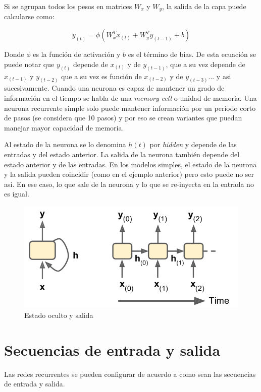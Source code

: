 Si se agrupan todos los pesos en matrices $W_{x}$ y $W_{y}$, la salida de la capa puede calcularse como: 

\begin{equation}
	y_{(t)} = \phi (W_x^{T} x_{(t)} + W_y^{T} y_{(t-1)} + b)
\end{equation}

Donde $\phi$ es la función de activación y $b$ es el término de bias. De esta ecuación se  puede notar que $y_{(t)}$ depende de $x_{(t)}$ y de $y_{(t-1)}$, que a su vez depende de $x_{(t-1)}$ y $y_{(t-2)}$ que a su vez es función de $x_{(t-2)}$ y  de $y_{(t-3)}$... y asi sucesivamente. Cuando una neurona es capaz de mantener un grado de información en el tiempo se habla de una \textit{memory cell} o unidad de memoria. Una neurona recurrente simple solo puede mantener información por un período corto de pasos (se considera que 10 pasos) y por eso se crean variantes que puedan manejar mayor capacidad de memoria. 

Al estado de la neurona se lo denomina $h(t)$ por \textit{hidden} y depende de las entradas y del estado anterior. La salida de la neurona también depende del estado anterior y de las entradas. En los modelos simples, el estado de la neurona y la salida pueden coincidir (como en el ejemplo anterior) pero esto puede no ser asi. En ese caso, lo que sale de la neurona y lo que se re-inyecta en la entrada no es igual. 

\begin{figure}[h]
	\centering
	\includegraphics[scale=0.5]{images/estado.png}
	\caption{Estado oculto y salida}
	\label{fig:capa}
\end{figure}

\section{Secuencias de entrada y salida}
Las redes recurrentes se pueden configurar de acuerdo a como sean las secuencias de entrada y salida. 

